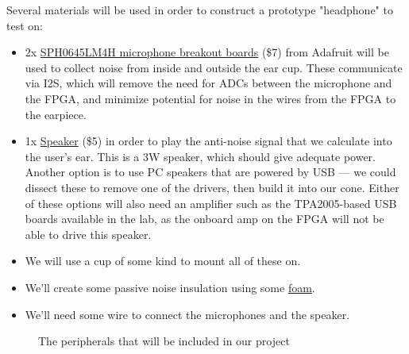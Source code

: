 \documentclass{fpgairpods}
\begin{document}
\begin{multicols}{2}
Several materials will be used in order to construct a prototype "headphone" to test on: 
\begin{itemize}
    \item 2x \href{https://www.adafruit.com/product/3421}{SPH0645LM4H microphone breakout boards} (\$7) from Adafruit will be used to collect noise from inside and outside the ear cup. These communicate via I2S, which will remove the need for ADCs between the microphone and the FPGA, and minimize potential for noise in the wires from the FPGA to the earpiece.
    \item 1x \href{https://www.adafruit.com/product/3968}{Speaker} (\$5) in order to play the anti-noise signal that we calculate into the user's ear. This is a 3W speaker, which should give adequate power. Another option is to use PC speakers that are powered by USB --- we could dissect these to remove one of the drivers, then build it into our cone. Either of these options will also need an amplifier such as the TPA2005-based USB boards available in the lab, as the onboard amp on the FPGA will not be able to drive this speaker.
    \item We will use a cup of some kind to mount all of these on.
    \item We'll create some passive noise insulation using some \href{https://www.amazon.com/Silverstone-21-Inch-Dampening-Acoustic-SF01/dp/B0040JHMH6?th=1}{foam}.
    \item We'll need some wire to connect the microphones and the speaker.
\end{itemize}

\end{multicols}


\begin{figure}[h]
\centering
\def\svgwidth{200pt}

\caption{The peripherals that will be included in our project}
\label{fig:peripherals}
\end{figure}
\end{document}
